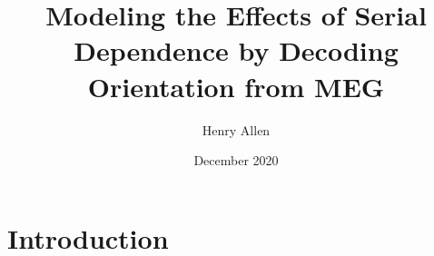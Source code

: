 \documentclass[a4paper,man]{apa6}
\begin{document}
\title{Modeling the Effects of Serial Dependence by Decoding Orientation from MEG}
\author{Henry Allen }
\date{December 2020}

%  

\maketitle

\section{Introduction}


%

%

%


\end{document}
